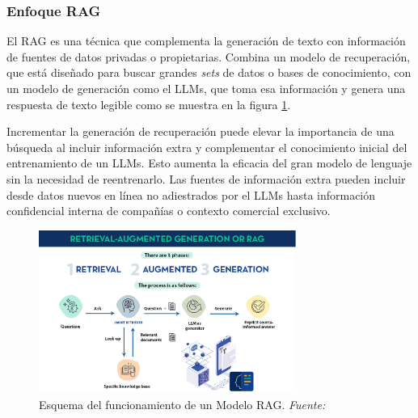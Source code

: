 \subsubsection{Enfoque RAG}
\label{subsubsec:enfoquerag}

El \acrfull{RAG} es una técnica que complementa la generación de texto con información de fuentes de datos privadas o propietarias\cite{GobiernoEspana_RAG}. Combina un modelo de recuperación, que está diseñado para buscar grandes \textit{sets} de datos o bases de conocimiento, con un modelo de generación como el \acrfull{LLMs}, que toma esa información y genera una respuesta de texto legible como se muestra en la figura \ref{fig:2_RAG}.

Incrementar la generación de recuperación puede elevar la importancia de una búsqueda al incluir información extra y complementar el conocimiento inicial del entrenamiento de un \acrshort{LLMs}. Esto aumenta la eficacia del gran modelo de lenguaje sin la necesidad de reentrenarlo. Las fuentes de información extra pueden incluir desde datos nuevos en línea no adiestrados por el \acrshort{LLMs} hasta información confidencial interna de compañías o contexto comercial exclusivo.

\bigskip %

\begin{figure}[hp!]
  \centering
  \includegraphics[width=0.75\textwidth]{imaxes/2_RAG.png}
  \caption[Esquema del funcionamiento de un Modelo RAG]{Esquema del funcionamiento de un Modelo RAG. \textit{Fuente: \cite{GobiernoEspana_RAG}}}
  \label{fig:2_RAG}
\end{figure}




